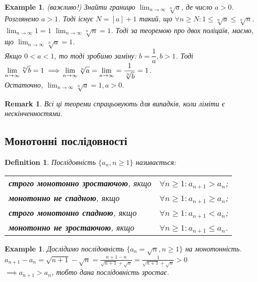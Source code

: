 \documentclass[a4paper, 14pt]{article}
\theoremstyle{theoremdd}
\theoremstyle{theoremdd}
\newtheorem{definition}[theorem]{Definition}
\theoremstyle{theoremdd}
\theoremstyle{theoremdd}
\newtheorem{example}[theorem]{Example}
\theoremstyle{theoremdd}
\theoremstyle{theoremdd}
\newtheorem{remark}[theorem]{Remark}
\theoremstyle{theoremdd}
\theoremstyle{theoremdd}
\begin{document}
	\begin{example}
	(важливо!) Знайти границю $\displaystyle\lim_{n \to \infty} \sqrt[n]{a}$, де число $a>0$. \\
	Розглянемо $a > 1$. Тоді існує $N = [a]+1$ такий, що $\forall n \geq N: 1 \leq \sqrt[n]{a} \leq \sqrt[n]{n}$.\\
	$\displaystyle\lim_{n \to \infty} 1 = 1$ \quad $\displaystyle\lim_{n \to \infty} \sqrt[n]{n} = 1$. Тоді за теоремою про двох поліцаїв, маємо, що $\displaystyle\lim_{n \to \infty} \sqrt[n]{a} = 1$.\\
	Якщо $0 < a < 1$, то тоді зробимо заміну: $b = \dfrac{1}{a}, b > 1$. Тоді $\displaystyle\lim_{n \to \infty} \sqrt[n]{b} = 1 \implies \\ \displaystyle\lim_{n \to \infty} \sqrt[n]{a} = \displaystyle\lim_{n \to \infty} = \dfrac{1}{\sqrt[n]{b}} = 1$.\\
	Остаточно, $\displaystyle\lim_{n \to \infty} \sqrt[n]{a} = 1, a > 0$.
	\end{example}
	
	\begin{remark}
	Всі ці теореми спрацьовують для випадків, коли ліміти є нескінченностями.
	\end{remark}
	
	\subsection{Монотонні послідовності}
	\begin{definition}
	Послідовність $\{a_n, n \geq 1\}$ називається: \\
	\begin{tabular}{ll}
	\textbf{строго монотонно зростаючою}, якщо & $\forall n \geq 1: a_{n+1} > a_n$; \\
	\textbf{монотонно не спадною}, якщо & $\forall n \geq 1: a_{n+1} \geq a_n$; \\
	\textbf{строго монотонно спадною}, якщо & $\forall n \geq 1: a_{n+1} < a_n$; \\
	\textbf{монотонно не зростаючою}, якщо & $\forall n \geq 1: a_{n+1} \leq a_n$.
	\end{tabular}
	\end{definition}
	
	\begin{example}
	Дослідимо послідовність $\{a_n = \sqrt{n}, n \geq 1 \}$ на монотонність.\\
	$\displaystyle a_{n+1} - a_n = \sqrt{n+1} - \sqrt{n} = \frac{n+1-n}{\sqrt{n+1} + \sqrt{n}} = \frac{1}{\sqrt{n+1} + \sqrt{n}} > 0$\\
	$\implies a_{n+1}>a_n$, тобто дана послідовність зростає.
	\end{example}
	
\end{document}

